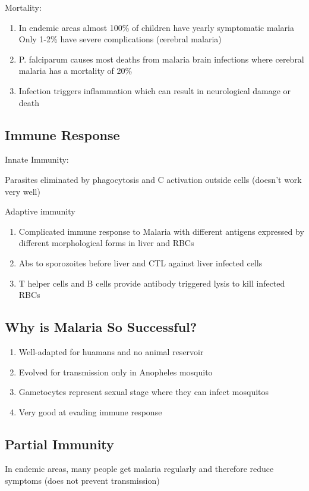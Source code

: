 \documentclass{notes}
\begin{document}
Mortality:
\begin{enumerate}
    \item In endemic areas almost 100\% of children have yearly symptomatic malaria
    \subitem Only 1-2\% have severe complications (cerebral malaria)
    \item P. falciparum causes most deaths from malaria brain infections where cerebral malaria has a mortality of 20\%
    \item Infection triggers inflammation which can result in neurological damage or death
\end{enumerate}

\subsection*{Immune Response}
Innate Immunity:

Parasites eliminated by phagocytosis and C activation outside cells (doesn't work very well)

Adaptive immunity
\begin{enumerate}
    \item Complicated immune response to Malaria with different antigens expressed by different morphological forms in liver and RBCs
    \item Abs to sporozoites before liver and CTL against liver infected cells
    \item T helper cells and B cells provide antibody triggered lysis to kill infected RBCs
\end{enumerate}

\subsection*{Why is Malaria So Successful?}
\begin{enumerate}
    \item Well-adapted for huamans and no animal reservoir
    \item Evolved for transmission only in Anopheles mosquito
    \item Gametocytes represent sexual stage where they can infect mosquitos
    \item Very good at evading immune response
\end{enumerate}

\subsection*{Partial Immunity}
In endemic areas, many people get malaria regularly and therefore reduce symptoms (does not prevent transmission)
\end{document}
